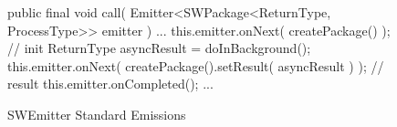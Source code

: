 \begin{figure}[h]
\begin{sourcecode}
\begin{javacode}{}
public final void call( Emitter<SWPackage<ReturnType, ProcessType>> emitter ) {
	...
	this.emitter.onNext( createPackage() ); // init
	ReturnType asyncResult = doInBackground();
	this.emitter.onNext( createPackage().setResult( asyncResult ) ); // result
	this.emitter.onCompleted();
	...
}
\end{javacode}
\caption{SWEmitter Standard Emissions}
\label{code:swemitter-regular-emissions}
\end{sourcecode}
\end{figure}